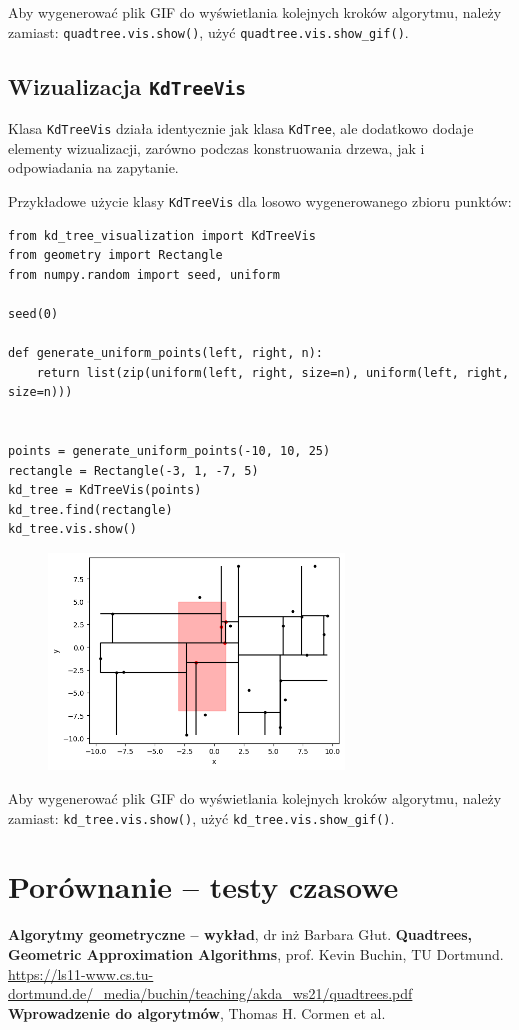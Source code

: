 \documentclass[11pt]{scrartcl}
\begin{document}
Aby wygenerować plik GIF do wyświetlania kolejnych kroków algorytmu, należy zamiast:
\texttt{quadtree.vis.show()}, użyć \texttt{quadtree.vis.show\_gif()}.

\newpage

\subsection{Wizualizacja \texttt{KdTreeVis}}
Klasa \texttt{KdTreeVis} działa identycznie jak klasa \texttt{KdTree}, ale dodatkowo dodaje elementy wizualizacji, zarówno podczas konstruowania drzewa, jak i odpowiadania na zapytanie.

Przykładowe użycie klasy \texttt{KdTreeVis} dla losowo wygenerowanego zbioru punktów:

\begin{verbatim}
from kd_tree_visualization import KdTreeVis
from geometry import Rectangle
from numpy.random import seed, uniform

seed(0)

def generate_uniform_points(left, right, n):
    return list(zip(uniform(left, right, size=n), uniform(left, right, size=n)))


points = generate_uniform_points(-10, 10, 25)
rectangle = Rectangle(-3, 1, -7, 5)
kd_tree = KdTreeVis(points)
kd_tree.find(rectangle)
kd_tree.vis.show()
\end{verbatim}

\begin{figure}[H]
    \centering
    \includegraphics[width=0.7\textwidth]{imgs/kd_tree_vis}
\end{figure}

Aby wygenerować plik GIF do wyświetlania kolejnych kroków algorytmu, należy zamiast:
\texttt{kd\_tree.vis.show()}, użyć \texttt{kd\_tree.vis.show\_gif()}.

\section{Porównanie -- testy czasowe}


\begin{thebibliography}{9}
     \textbf{Algorytmy geometryczne -- wykład}, dr inż Barbara Głut.
     \textbf{Quadtrees, Geometric Approximation Algorithms}, prof. Kevin Buchin, TU Dortmund.
        \url{https://ls11-www.cs.tu-dortmund.de/_media/buchin/teaching/akda_ws21/quadtrees.pdf}
         \textbf{Wprowadzenie do algorytmów}, Thomas H. Cormen et al.
\end{thebibliography}
\end{document}
